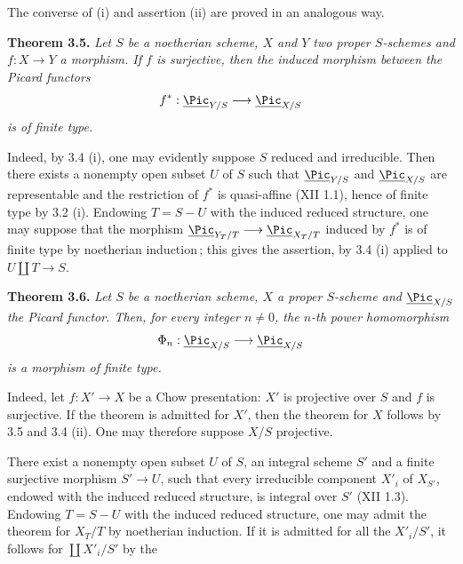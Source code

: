 The converse of (i) and assertion (ii) are proved in an analogous way.

\textbf{Theorem 3.5.} \emph{Let \(S\) be a noetherian scheme, \(X\) and \(Y\) two proper \(S\)-schemes and \(f:X\to Y\) a morphism. If \(f\) is surjective, then the induced morphism between the Picard functors}
\[
f^*:\underline{\Pic}_{Y/S}\longrightarrow\underline{\Pic}_{X/S}
\]
%
\emph{is of finite type.}

Indeed, by 3.4 (i), one may evidently suppose \(S\) reduced and irreducible. Then there exists a nonempty open subset \(U\) of \(S\) such that \(\underline{\Pic}_{Y/S}\) and \(\underline{\Pic}_{X/S}\) are representable and the restriction of \(f^*\) is quasi-affine (XII 1.1), hence of finite type by 3.2 (i). Endowing \(T=S-U\) with the induced reduced structure, one may suppose that the morphism \(\underline{\Pic}_{Y_T/T}\longrightarrow\underline{\Pic}_{X_T/T}\) induced by \(f^*\) is of finite type by noetherian induction\,; this gives the assertion, by 3.4 (i) applied to \(U\amalg T\to S\).

\textbf{Theorem 3.6.} \emph{Let \(S\) be a noetherian scheme, \(X\) a proper \(S\)-scheme and \(\underline{\Pic}_{X/S}\) the Picard functor. Then, for every integer \(n\ne0\), the \(n\)-th power homomorphism}
\[
\Phi_n:\underline{\Pic}_{X/S}\longrightarrow\underline{\Pic}_{X/S}
\]
\emph{is a morphism of finite type.}

Indeed, let \(f:X'\to X\) be a Chow presentation: \(X'\) is projective over \(S\) and \(f\) is surjective. If the theorem is admitted for \(X'\), then the theorem for \(X\) follows by 3.5 and 3.4 (ii). One may therefore suppose \(X/S\) projective.

There exist a nonempty open subset \(U\) of \(S\), an integral scheme \(S'\) and a finite surjective morphism \(S'\to U\), such that every irreducible component \(X'_i\) of \(X_{S'}\), endowed with the induced reduced structure, is integral over \(S'\) (XII 1.3). Endowing \(T=S-U\) with the induced reduced structure, one may admit the theorem for \(X_T/T\) by noetherian induction. If it is admitted for all the \(X'_i/S'\), it follows for \(\coprod X'_i/S'\) by the
